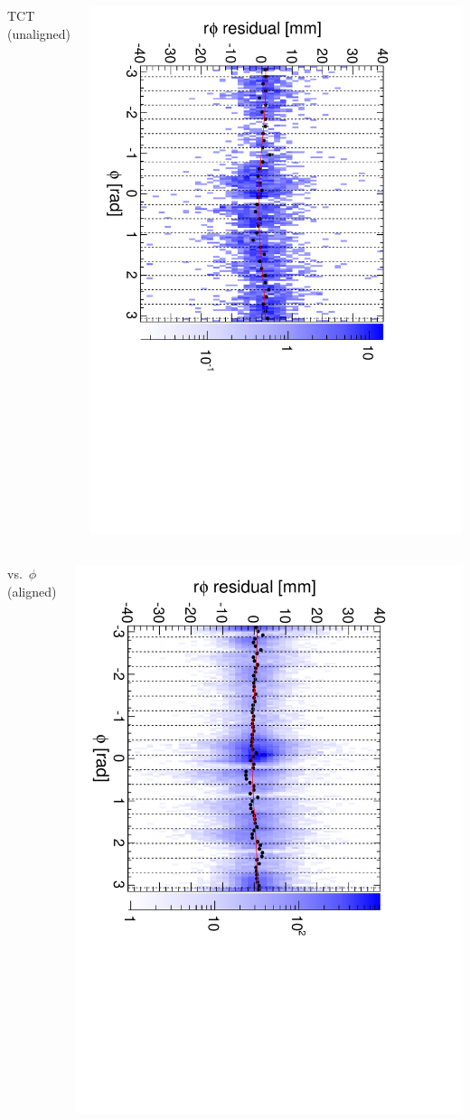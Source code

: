 \documentclass[compress]{beamer}
\begin{document}
\begin{frame}
\begin{columns}
\centering TCT (unaligned)

\includegraphics[height=\linewidth, angle=90]{diskiter01_p2to3_TST.pdf}
\end{columns}

\begin{columns}
\centering vs.\ $\phi$ (aligned)

\includegraphics[height=\linewidth, angle=90]{diskiter02_p2to3.pdf}


\end{columns}
\end{frame}
\end{document}
